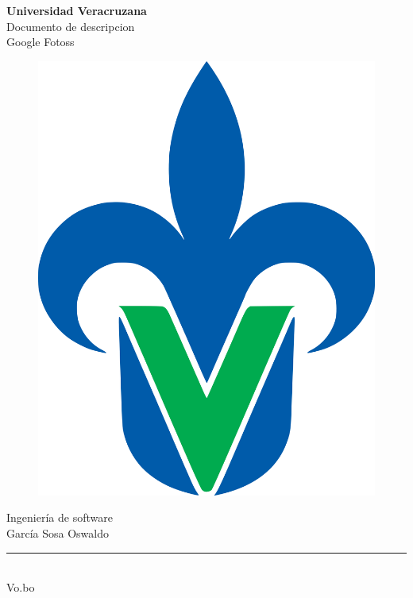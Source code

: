 \begin{titlepage}
	\begin{center}
	{\huge \textbf{Universidad Veracruzana}}\\
	\vspace{2cm}  
	{\Large {Documento de descripcion}}\\
	\vspace{5mm}	
	{\Large {Google Fotoss}}\\
	\begin{figure}[h]
		\centering
		\includegraphics[scale=0.10]{uvlogo}
	\end{figure}
	{\Large {Ingeniería de software}}\\
    \vspace{2cm}
	{\Large {García Sosa Oswaldo }}\\
	\vspace{25mm}	
    \rule{8cm}{0.5mm} \\ \Large Vo.bo\\ 
	\end{center}
\end{titlepage}